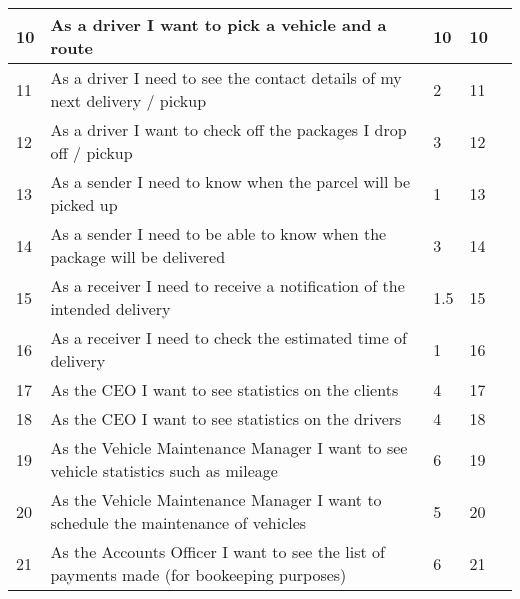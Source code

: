 \documentclass[paper=a4, fontsize=11pt]{scrartcl} %
\numberwithin{equation}{section} %
\numberwithin{figure}{section} %
\numberwithin{table}{section} %
\begin{document}
\begin{table}[]
\begin{tabular}{|p{1cm}|p{8cm}|p{2cm}|p{1.2cm}|p{1.5cm}|}
10          & As a driver I want to pick a vehicle and a route                                                       & 10                & 10                &                \\ \hline
11          & As a driver I need to see the contact details of my next delivery / pickup                             & 2                 & 11                &                \\ \hline
12          & As a driver I want to check off the packages I drop off / pickup                                       & 3                 & 12                &                \\ \hline
13          & As a sender I need to know when the parcel will be picked up                                           & 1                 & 13                &                \\ \hline
14          & As a sender I need to be able to know when the package will be delivered                               & 3                 & 14                &                \\ \hline
15          & As a receiver I need to receive a notification of the intended delivery                                & 1.5               & 15                &                \\ \hline
16          & As a receiver I need to check the estimated time of delivery                                           & 1                 & 16                &                \\ \hline
17          & As the CEO I want to see statistics on the clients                                                     & 4                 & 17                &                \\ \hline
18          & As the CEO I want to see statistics on the drivers                                                     & 4                 & 18                &                \\ \hline
19          & As the Vehicle Maintenance Manager I want to see vehicle statistics such as mileage                    & 6                 & 19                &                \\ \hline
20          & As the Vehicle Maintenance Manager I want to schedule the maintenance of vehicles                      & 5                 & 20                &                \\ \hline
21          & As the Accounts Officer I want to see the list of payments made (for bookeeping purposes)              & 6                 & 21                &                \\ \hline

\end{tabular}
\end{table}
\end{document}
